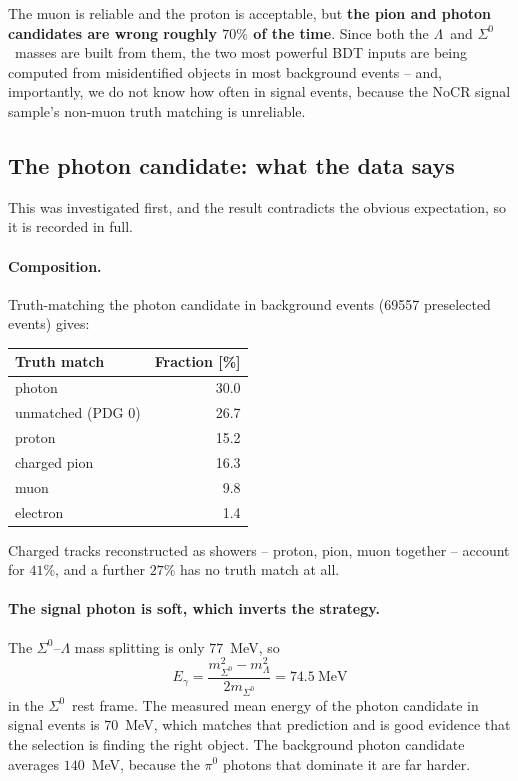 \documentclass[11pt,a4paper]{article}
\newcommand{\Szero}{\ensuremath{\Sigma^{0}}}
\newcommand{\Lam}{\ensuremath{\Lambda}}
\begin{document}
\noindent The muon is reliable and the proton is acceptable, but \textbf{the pion
and photon candidates are wrong roughly $70\%$ of the time}. Since both the \Lam\
and \Szero\ masses are built from them, the two most powerful BDT inputs are being
computed from misidentified objects in most background events -- and, importantly,
we do not know how often in signal events, because the NoCR signal sample's
non-muon truth matching is unreliable.

\subsection{The photon candidate: what the data says}
\label{sec:photonstudy}

This was investigated first, and the result contradicts the obvious expectation, so
it is recorded in full.

\paragraph{Composition.} Truth-matching the photon candidate in background events
(69557 preselected events) gives:

\begin{center}
\begin{tabular}{lr}
\toprule
Truth match & Fraction [\%] \\
\midrule
photon              & 30.0 \\
unmatched (PDG 0)   & 26.7 \\
proton              & 15.2 \\
charged pion        & 16.3 \\
muon                &  9.8 \\
electron            &  1.4 \\
\bottomrule
\end{tabular}
\end{center}

\noindent Charged tracks reconstructed as showers -- proton, pion, muon together --
account for $41\%$, and a further $27\%$ has no truth match at all.

\paragraph{The signal photon is soft, which inverts the strategy.} The
$\Szero$--$\Lam$ mass splitting is only $77$~MeV, so
\begin{equation}
  E_\gamma = \frac{m_{\Szero}^2 - m_{\Lam}^2}{2 m_{\Szero}} = 74.5~\mathrm{MeV}
\end{equation}
in the \Szero\ rest frame. The measured mean energy of the photon candidate in
signal events is $70$~MeV, which matches that prediction and is good evidence that
the selection is finding the right object. The background photon candidate averages
$140$~MeV, because the $\pi^0$ photons that dominate it are far harder.
\end{document}
